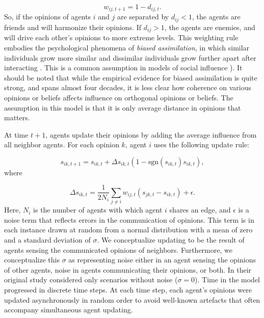 \begin{equation} 
  w_{ij,t+1} = 1 - d_{ij,t}.  
\end{equation} 
\noindent
So, if the opinions of agents $i$ and $j$ are separated by $d_{ij} < 1$, 
the agents are friends and will harmonize their opinions. If $d_{ij} > 1$, 
the agents are enemies, and will drive each other's opinions to more extreme levels.
This weighting rule embodies the psychological phenomena of {\em biased assimilation},
in which similar individuals grow more similar and dissimilar individuals grow
further apart after interacting \cite{Lord1979}. This is a common assumption in models
of social influence \cite{Hegselmann2002,Flache2011,Dandekar2013}). 
It should be noted that while the
empirical evidence for biased assimilation is quite strong, and spans almost four decades, it is less clear how coherence on various opinions or beliefs affects influence on orthogonal opinions or beliefs. The assumption in this model is that it is only average distance in opinions that matters.  

At time $t+1$, agents update their opinions by adding the average 
influence from all neighbor agents.  For each opinion $k$, 
agent $i$ uses the following update rule: 

\begin{equation} 
  s_{ik,t+1} = s_{ik,t} + \Delta s_{ik,t} \left(1 - \text{sgn}(s_{ik,t}) s_{ik,t} \right), 
  \label{eq:smoothed-update}
\end{equation} 
\noindent
where

\begin{equation}
  \Delta s_{ik,t} = \frac{1}{2N_i} \sum_{j \neq i} w_{ij,t} (s_{jk,t} - s_{ik,t}) + \epsilon.  
\end{equation} 
\noindent
Here, $N_i$ is the number of agents
with which agent $i$ shares an edge, and $\epsilon$ is a noise term that
reflects errors in the communication of opinions. This term is in each
instance drawn at random from a normal distribution with a mean of zero and a
standard deviation of $\sigma$. We conceptualize updating to be the result of
agents sensing the communicated opinions of neighbors. Furthermore, we 
conceptualize this $\sigma$ as representing noise either in an agent 
sensing the opinions of other agents, noise in agents communicating their
opinions, or both. In their original study  considered only scenarios without noise ($\sigma = 0$).  
Time in the model progressed in discrete time steps. At each time step, each agent's opinions were updated asynchronously in random order to avoid well-known artefacts that often accompany simultaneous agent updating. 

